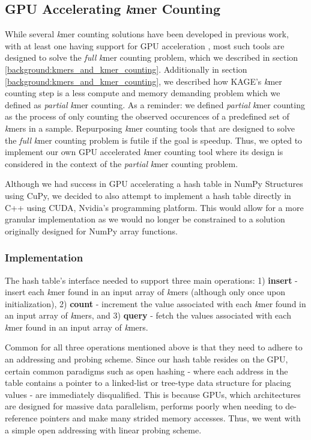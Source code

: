 \subsection{GPU Accelerating \textit{k}mer Counting}
While several \textit{k}mer counting solutions have been developed in previous work, with at least one having support for GPU acceleration \cite{kmer_counting_tools}, most such tools are designed to solve the \textit{full} \textit{k}mer counting problem, which we described in section \ref{background:kmers_and_kmer_counting}.
Additionally in section \ref{background:kmers_and_kmer_counting}, we described how KAGE's \textit{k}mer counting step is a less compute and memory demanding problem which we defined as \textit{partial} \textit{k}mer counting.
As a reminder: we defined \textit{partial} \textit{k}mer counting as the process of only counting the observed occurences of a predefined set of \textit{k}mers in a sample.
Repurposing \textit{k}mer counting tools that are designed to solve the \textit{full} \textit{k}mer counting problem is futile if the goal is speedup.
Thus, we opted to implement our own GPU accelerated \textit{k}mer counting tool where its design is considered in the context of the \textit{partial} \textit{k}mer counting problem.

Although we had success in GPU accelerating a hash table in NumPy Structures using CuPy, we decided to also attempt to implement a hash table directly in C++ using CUDA, Nvidia's programming platform.
This would allow for a more granular implementation as we would no longer be constrained to a solution originally designed for NumPy array functions.

\subsubsection{Implementation}
The hash table's interface needed to support three main operations: 1) \textbf{insert} - insert each \textit{k}mer found in an input array of \textit{k}mers (although only once upon initialization), 2) \textbf{count} - increment the value associated with each \textit{k}mer found in an input array of \textit{k}mers, and 3) \textbf{query} - fetch the values associated with each \textit{k}mer found in an input array of \textit{k}mers.

Common for all three operations mentioned above is that they need to adhere to an addressing and probing scheme.
Since our hash table resides on the GPU, certain common paradigms such as open hashing - where each address in the table contains a pointer to a linked-list or tree-type data structure for placing values - are immediately disqualified.
This is because GPUs, which architectures are designed for massive data parallelism, performs poorly when needing to de-reference pointers and make many strided memory accesses.
Thus, we went with a simple open addressing with linear probing scheme. 

